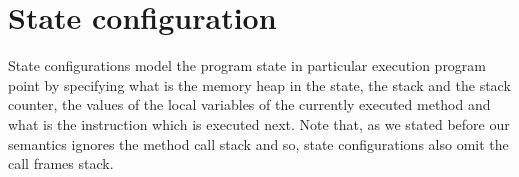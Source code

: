 
\newtheorem{StateProp0}{Substitution Property for Expressions}
\newtheorem{StateProp1}[StateProp0]{Substitution Property for Formulas}
\newtheorem{UpdateStateSem}[StateProp0]{Definition}


\newtheorem{AtState}{Definition}


\newtheorem{FormulaInterp}[AtState]{Definition}
\newtheorem{StateProp2}[AtState]{Substitution Property for Field Functions } %

\index{\SetConfigs}
 \index{\counterOnly{}}
\index{\stackOnly{}}
\index{\locVarOnly}
\index{\pc}


\section{State configuration}\label{def}

 State configurations  model the program state in particular execution
 program point by specifying what is the memory heap in the state, the stack and the stack counter, the values of the
 local variables of the currently executed method  and what is the instruction which is executed next. Note that, as we stated before our 
 semantics ignores the method call stack and so, state configurations also omit the call frames stack. 
 
